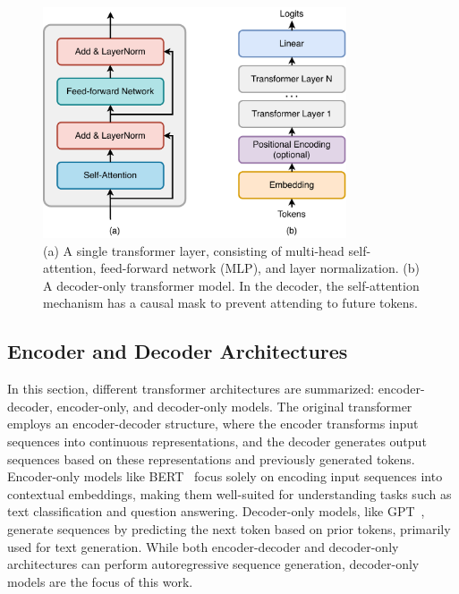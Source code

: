 \begin{figure}[h!]
    \centering
    \includegraphics[width=0.8\textwidth]{fig/transformer_layer.pdf}
    \caption{(a) A single transformer layer, consisting of multi-head self-attention, feed-forward network (MLP), and layer normalization. (b) A decoder-only transformer model. In the decoder, the self-attention mechanism has a causal mask to prevent attending to future tokens.}
    \label{fig:transformer_layer}
\end{figure}


\subsection{Encoder and Decoder Architectures}\label{subsec:types_transformers}

In this section, different transformer architectures are summarized: encoder-decoder, encoder-only, and decoder-only models. The original transformer~\parencite{vaswani_attention_2017} employs an encoder-decoder structure, where the encoder transforms input sequences into continuous representations, and the decoder generates output sequences based on these representations and previously generated tokens. Encoder-only models like BERT~\parencite{devlin_bert_2019} focus solely on encoding input sequences into contextual embeddings, making them well-suited for understanding tasks such as text classification and question answering. Decoder-only models, like GPT~\parencite{radford_improving_2018}, generate sequences by predicting the next token based on prior tokens, primarily used for text generation. While both encoder-decoder and decoder-only architectures can perform autoregressive sequence generation, decoder-only models are the focus of this work.

